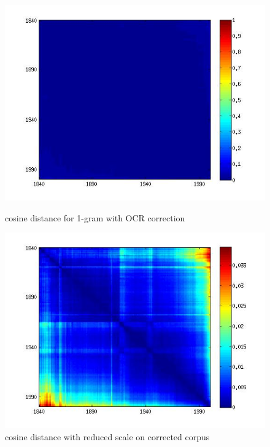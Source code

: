 \begin{figure}[H]
    \begin{minipage}[b]{0.48\linewidth}
        \includegraphics[scale=0.3]{Pictures/cos/cos_corrected2.jpg}
        \caption{cosine distance for 1-gram with OCR correction}
        \label{cos_1}
    \end{minipage}\hfill
    \begin{minipage}[b]{0.5\linewidth}
        \includegraphics[scale=0.3]{Pictures/cos/cos_corrected.jpg}
        \caption{cosine distance with reduced scale on corrected corpus}
        \label{cos_2}
    \end{minipage}\hfill
\end{figure}
